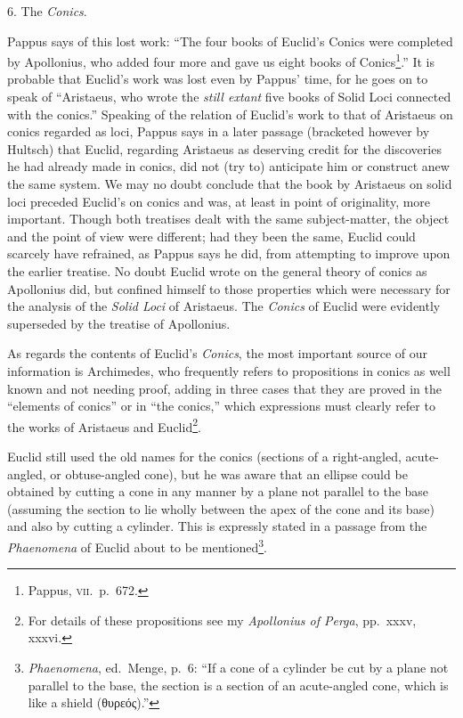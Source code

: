 6. The \emph{Conics}.

Pappus says of this lost work: ``The four books of Euclid's Conics were completed by Apollonius, who added four more and gave us eight books of Conics\footnote{Pappus, \textsc{vii.}\ p.~672.}.'' It is probable that Euclid's work was lost even by Pappus' time, for he goes on to speak of ``Aristaeus, who wrote the \emph{still extant} five books of Solid Loci connected with the conics.'' Speaking of the relation of Euclid's work to that of Aristaeus on conics regarded as loci, Pappus says in a later passage (bracketed however by Hultsch) that Euclid, regarding Aristaeus as deserving credit for the discoveries he had already made in conics, did not (try to) anticipate him or construct anew the same system. We may no doubt conclude that the book by Aristaeus on solid loci preceded Euclid's on conics and was, at least in point of originality, more important. Though both treatises dealt with the same subject-matter, the object and the point of view were different; had they been the same, Euclid could scarcely have refrained, as Pappus says he did, from attempting to improve upon the earlier treatise. No doubt Euclid wrote on the general theory of conics as Apollonius did, but confined himself to those properties which were necessary for the analysis of the \emph{Solid Loci} of Aristaeus. The \emph{Conics} of Euclid were evidently superseded by the treatise of Apollonius.

As regards the contents of Euclid's \emph{Conics}, the most important source of our information is Archimedes, who frequently refers to propositions in conics as well known and not needing proof, adding in three cases that they are proved in the ``elements of conics'' or in ``the conics,'' which expressions must clearly refer to the works of Aristaeus and Euclid\footnote{For details of these propositions see my \emph{Apollonius of Perga}, pp.~xxxv, xxxvi.}.

Euclid still used the old names for the conics (sections of a right-angled, acute-angled, or obtuse-angled cone), but he was aware that an ellipse could be obtained by cutting a cone in any manner by a plane not parallel to the base (assuming the section to lie wholly between the apex of the cone and its base) and also by cutting a cylinder. This is expressly stated in a passage from the \emph{Phaenomena} of Euclid about to be mentioned\footnote{\emph{Phaenomena}, ed.\ Menge, p.~6: ``If a cone of a cylinder be cut by a plane not parallel to the base, the section is a section of an acute-angled cone, which is like a shield (θυρεός).''}.

